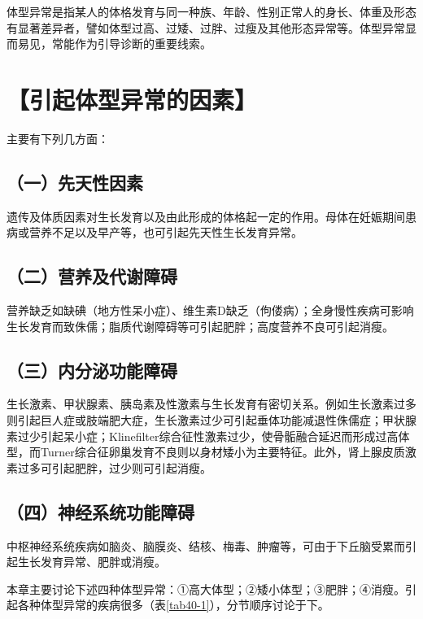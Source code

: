 体型异常是指某人的体格发育与同一种族、年龄、性别正常人的身长、体重及形态有显著差异者，譬如体型过高、过矮、过胖、过瘦及其他形态异常等。体型异常显而易见，常能作为引导诊断的重要线索。

\section{【引起体型异常的因素】}

主要有下列几方面：

\subsection{（一）先天性因素}

遗传及体质因素对生长发育以及由此形成的体格起一定的作用。母体在妊娠期间患病或营养不足以及早产等，也可引起先天性生长发育异常。

\subsection{（二）营养及代谢障碍}

营养缺乏如缺碘（地方性呆小症）、维生素D缺乏（佝偻病）；全身慢性疾病可影响生长发育而致侏儒；脂质代谢障碍等可引起肥胖；高度营养不良可引起消瘦。

\subsection{（三）内分泌功能障碍}

生长激素、甲状腺素、胰岛素及性激素与生长发育有密切关系。例如生长激素过多则引起巨人症或肢端肥大症，生长激素过少可引起垂体功能减退性侏儒症；甲状腺素过少引起呆小症；Klinefilter综合征性激素过少，使骨骺融合延迟而形成过高体型，而Turner综合征卵巢发育不良则以身材矮小为主要特征。此外，肾上腺皮质激素过多可引起肥胖，过少则可引起消瘦。

\subsection{（四）神经系统功能障碍}

中枢神经系统疾病如脑炎、脑膜炎、结核、梅毒、肿瘤等，可由于下丘脑受累而引起生长发育异常、肥胖或消瘦。

本章主要讨论下述四种体型异常：①高大体型；②矮小体型；③肥胖；④消瘦。引起各种体型异常的疾病很多（表\ref{tab40-1}），分节顺序讨论于下。

